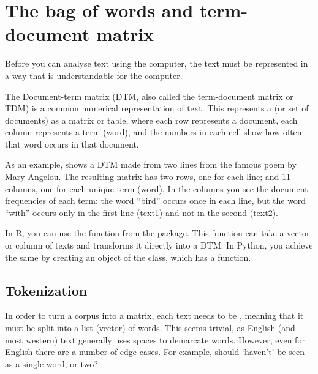 \section{The bag of words and term-document matrix}
\label{sec:dtm}

Before you can analyse text using the computer, the text must be represented in a way that is understandable for the computer.

The Document-term matrix (DTM, also called the term-document matrix or TDM) is a common numerical representation of text.
This represents a  (or set of documents) as a matrix or table, where each row represents a document, each column represents a term (word),
and the numbers in each cell show how often that word occurs in that document.


As an example,  shows a DTM made from two lines from the famous poem by Mary Angelou.
The resulting matrix has two rows, one for each line; and 11 columns, one for each unique term (word).
In the columns you see the document frequencies of each term: the word ``bird'' occurs once in each line,
but the word ``with'' occurs only in the first line (text1) and not in the second (text2).

In R, you can use the  function from the  package.
This function can take a vector or column of texts and transforms it directly into a DTM.
In Python, you achieve the same by creating an object of the  class, which has a  function.


\subsection{Tokenization}

In order to turn a corpus into a matrix, each text needs to be ,
meaning that it must be split into a list (vector) of words.
This seems trivial, as English (and most western) text generally uses spaces to demarcate words.
However, even for English there are a number of edge cases. 
For example, should `haven't' be seen as a single word, or two?



